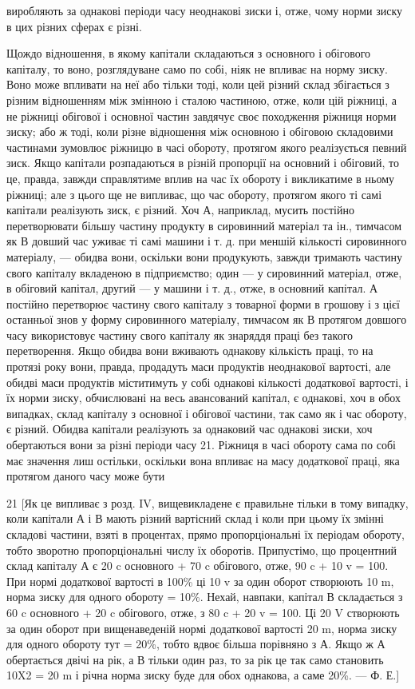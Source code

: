 виробляють за однакові періоди часу неоднакові зиски і, отже,
чому норми зиску в цих різних сферах є різні.

Щождо відношення, в якому капітали складаються з основного і обігового капіталу, то воно,
розглядуване само по собі, ніяк не впливає на норму зиску. Воно може впливати на неї або тільки
тоді, коли цей різний склад збігається з різним відношенням між змінною і сталою частиною, отже,
коли цій ріжниці, а не ріжниці обігової і основної частин завдячує своє походження ріжниця норми
зиску; або ж тоді, коли різне відношення між основною і обіговою складовими частинами зумовлює
ріжницю в часі обороту, протягом якого реалізується певний зиск. Якщо капітали розпадаються в різній
пропорції на основний і обіговий, то це, правда, завжди справлятиме вплив
на час їх обороту і викликатиме в ньому ріжниці; але з цього
ще не випливає, що час обороту, протягом якого ті самі капітали реалізують зиск, є різний. Хоч А,
наприклад, мусить постійно перетворювати більшу частину продукту в сировинний матеріал та ін.,
тимчасом як В довший час уживає ті самі
машини і т. д. при меншій кількості сировинного матеріалу, — обидва вони, оскільки вони продукують,
завжди тримають
частину свого капіталу вкладеною в підприємство; один — у сировинний матеріал, отже, в обіговий
капітал, другий — у машини
і т. д., отже, в основний капітал. А постійно перетворює частину свого капіталу з товарної форми в
грошову і з цієї останньої знов у форму сировинного матеріалу, тимчасом як В протягом довшого часу
використовує частину свого капіталу як
знаряддя праці без такого перетворення. Якщо обидва вони
вживають однакову кількість праці, то на протязі року вони,
правда, продадуть маси продуктів неоднакової вартості, але
обидві маси продуктів міститимуть у собі однакові кількості
додаткової вартості, і їх норми зиску, обчислювані на весь авансований капітал, є однакові, хоч в
обох випадках, склад капіталу з
основної і обігової частини, так само як і час обороту, є різний.
Обидва капітали реалізують за однаковий час однакові зиски, хоч
обертаються вони за різні періоди часу 21. Ріжниця в часі обороту
сама по собі має значення лиш остільки, оскільки вона впливає
на масу додаткової праці, яка протягом даного часу може бути

21 [Як це випливає з розд. IV, вищевикладене є правильне тільки в тому
випадку, коли капітали А і В мають різний вартісний склад і коли при цьому
їх змінні складові частини, взяті в процентах, прямо пропорціональні їх періодам обороту, тобто
зворотно пропорціональні числу їх оборотів. Припустімо,
що процентний склад капіталу А є 20 c основного + 70 c обігового, отже,
90 c + 10 v = 100. При нормі додаткової вартості в 100\% ці 10 v за один оборот створюють 10 m, норма
зиску для одного обороту = 10\%. Нехай, навпаки, капітал В складається з 60 c основного + 20 c
обігового, отже, з 80 c + 20 v = 100.
Ці 20 V створюють за один оборот при вищенаведеній нормі додаткової вартості 20 m, норма зиску для
одного обороту тут = 20\%, тобто вдвоє більша
порівняно з А. Якщо ж А обертається двічі на рік, а В тільки один раз, то за
рік це так само становить 10X2 = 20 m і річна норма зиску буде для обох
однакова, а саме 20\%. — Ф. Е.]
